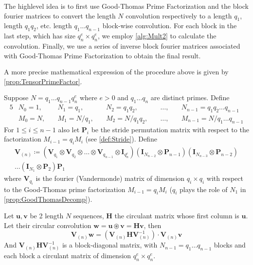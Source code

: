 The highlevel idea is to first use Good-Thomas Prime Factorization and the block fourier matrices to convert the length \(N\) convolution respectively to a length \(q_1\), length \(q_1 q_2\), etc. length \(q_1 \ldots q_{n-1}\) block-wise convolution. For each block in the last step, which has size \(q_n^e \times q_n^e\), we employ \cref{alg:Mult2} to calculate the convolution. Finally, we use a series of inverse block fourier matrices associated with Good-Thomas Prime Factorization to obtain the final result.

A more precise mathematical expression of the procedure above is given by \cref{prop:TensorPrimeFactor}.
\begin{proposition} \label{prop:TensorPrimeFactor}
    Suppose \(N = q_1 \ldots q_{n-1} q_n^e\) where \(e > 0\) and \(q_1 \ldots q_n\) are distinct primes. Define
    \begin{alignat*}{5}
        &N_0 = 1, \quad &N_1 = q_1, \quad &N_2 = q_1 q_2, \quad &\dots, \quad &N_{n-1} = q_1 q_2\ldots q_{n-1} \\
        &M_0 = N, \quad &M_1 = N / q_1, \quad &M_2 = N / q_1 q_2, \quad &\dots, \quad &M_{n-1} = N / q_1 \ldots q_{n-1}
    \end{alignat*}
    For \(1 \le i \le n-1\) also let \(\bm{P}_i\) be the stride permutation matrix with respect to the factorization \(M_{i-1}=  q_i M_i\) (see \cref{def:Stride}). Define
    \begin{multline*}
        \bm{V}_{(n)} \coloneq \left(\bm{V}_{q_1} \otimes \bm{V}_{q_2} \otimes \ldots \otimes \bm{V}_{q_{n-1}} \otimes \bm{I}_{q_n^e}\right) \left(\bm{I}_{N_{n-2}} \otimes \bm{P}_{n-1}\right) \left(\bm{I}_{N_{n-3}} \otimes \bm{P}_{n-2}\right) \\ 
        \ldots \left(\bm{I}_{N_1} \otimes \bm{P}_2\right) \bm{P}_1
    \end{multline*}
    where \(\bm{V}_{q_i}\) is the fourier (Vandermonde) matrix of dimension \(q_i \times q_i\) with respect to the Good-Thomas prime factorization \(M_{i-1} = q_i M_i\) (\(q_i\) plays the role of \(N_1\) in \cref{prop:GoodThomasDecomp}).

    Let \(\bm{u}, \bm{v}\) be 2 length \(N\) sequences, \(\bm{H}\) the circulant matrix whose first column is \(\bm{u}\). Let their circular convolution \(\bm{w} = \bm{u} \circledast \bm{v} = \bm{H} \bm{v}\), then
    \[\bm{V}_{(n)} \bm{w} = \left(\bm{V}_{(n)} \bm{H} \bm{V}_{(n)}^{-1}\right) \cdot \bm{V}_{(n)}\bm{v}\]
    And \(\bm{V}_{(n)} \bm{H} \bm{V}_{(n)}^{-1}\) is a block-diagonal matrix, with \(N_{n-1} = q_1 \ldots q_{n-1}\) blocks and each block a circulant matrix of dimension \(q_n^e \times q_n^e\).
\end{proposition}
